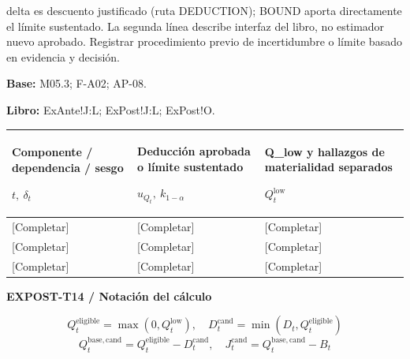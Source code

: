 delta es descuento justificado (ruta DEDUCTION); BOUND aporta directamente el límite sustentado. La segunda línea describe interfaz del libro, no estimador nuevo aprobado. Registrar procedimiento previo de incertidumbre o límite basado en evidencia y decisión.\par
\textbf{Base:} M05.3; F-A02; AP-08.\par
\textbf{Libro:} ExAnte!J:L; ExPost!J:L; ExPost!O.\par\endgroup
{\sffamily\fontsize{8.3}{10.3}\selectfont\begin{longtable}{@{}P{54.83mm} P{54.83mm} P{54.83mm}@{}}
\toprule
\textbf{Componente / dependencia / sesgo}\par {\normalfont\fontsize{8.2}{10}\selectfont $t,\ \delta_t$} & \textbf{Deducción aprobada o límite sustentado}\par {\normalfont\fontsize{8.2}{10}\selectfont $u_{Q_t},\ k_{1-\alpha}$} & \textbf{Q\_low y hallazgos de materialidad separados}\par {\normalfont\fontsize{8.2}{10}\selectfont $Q_t^{\mathrm{low}}$}\\\midrule\endhead
\rule{0pt}{8mm}[Completar] & [Completar] & [Completar]\\\hline
\rule{0pt}{8mm}[Completar] & [Completar] & [Completar]\\\hline
\rule{0pt}{8mm}[Completar] & [Completar] & [Completar]\\\hline
\end{longtable}}
\par\begingroup\sffamily\fontsize{8}{10}\selectfont\color{NEBGreen}\setlength{\parskip}{2pt}\setlength{\abovedisplayskip}{4pt}\setlength{\belowdisplayskip}{4pt}\setlength{\abovedisplayshortskip}{2pt}\setlength{\belowdisplayshortskip}{3pt}
\textbf{EXPOST-T14 / Notación del cálculo}\par
{\fontsize{9}{11}\selectfont\[ Q_t^{\mathrm{eligible}}=\max(0,Q_t^{\mathrm{low}}),\quad D_t^{\mathrm{cand}}=\min(D_t,Q_t^{\mathrm{eligible}}) \]}
{\fontsize{9}{11}\selectfont\[ Q_t^{\mathrm{base,cand}}=Q_t^{\mathrm{eligible}}-D_t^{\mathrm{cand}},\quad J_t^{\mathrm{cand}}=Q_t^{\mathrm{base,cand}}-B_t \]}
